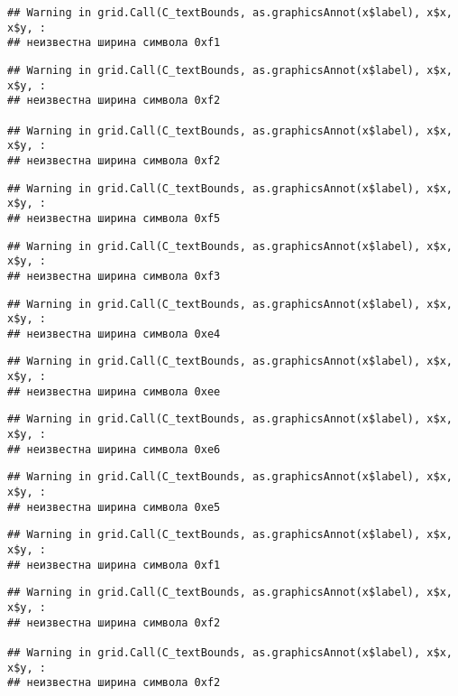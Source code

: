 \documentclass[
]{article}
\begin{document}
\begin{verbatim}
## Warning in grid.Call(C_textBounds, as.graphicsAnnot(x$label), x$x, x$y, :
## неизвестна ширина символа 0xf1
\end{verbatim}

\begin{verbatim}
## Warning in grid.Call(C_textBounds, as.graphicsAnnot(x$label), x$x, x$y, :
## неизвестна ширина символа 0xf2

## Warning in grid.Call(C_textBounds, as.graphicsAnnot(x$label), x$x, x$y, :
## неизвестна ширина символа 0xf2
\end{verbatim}

\begin{verbatim}
## Warning in grid.Call(C_textBounds, as.graphicsAnnot(x$label), x$x, x$y, :
## неизвестна ширина символа 0xf5
\end{verbatim}

\begin{verbatim}
## Warning in grid.Call(C_textBounds, as.graphicsAnnot(x$label), x$x, x$y, :
## неизвестна ширина символа 0xf3
\end{verbatim}

\begin{verbatim}
## Warning in grid.Call(C_textBounds, as.graphicsAnnot(x$label), x$x, x$y, :
## неизвестна ширина символа 0xe4
\end{verbatim}

\begin{verbatim}
## Warning in grid.Call(C_textBounds, as.graphicsAnnot(x$label), x$x, x$y, :
## неизвестна ширина символа 0xee
\end{verbatim}

\begin{verbatim}
## Warning in grid.Call(C_textBounds, as.graphicsAnnot(x$label), x$x, x$y, :
## неизвестна ширина символа 0xe6
\end{verbatim}

\begin{verbatim}
## Warning in grid.Call(C_textBounds, as.graphicsAnnot(x$label), x$x, x$y, :
## неизвестна ширина символа 0xe5
\end{verbatim}

\begin{verbatim}
## Warning in grid.Call(C_textBounds, as.graphicsAnnot(x$label), x$x, x$y, :
## неизвестна ширина символа 0xf1
\end{verbatim}

\begin{verbatim}
## Warning in grid.Call(C_textBounds, as.graphicsAnnot(x$label), x$x, x$y, :
## неизвестна ширина символа 0xf2

## Warning in grid.Call(C_textBounds, as.graphicsAnnot(x$label), x$x, x$y, :
## неизвестна ширина символа 0xf2
\end{verbatim}
\end{document}
